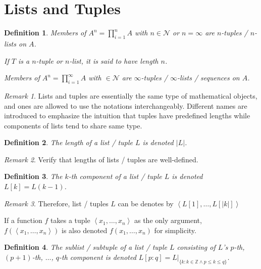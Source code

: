 \documentclass{book}
\newtheorem{definition}{Definition}
\theoremstyle{definition}\newtheorem{mechanism}{Mechanism}
\theoremstyle{remark}\newtheorem*{remark}{Remark}
\begin{document}
\section{Lists and Tuples}

\begin{definition}
	Members of $A^n = \prod_{i=1}^n A$ with $n\in \mathcal N$ or $n=\infty$ are $n$-tuples / $n$-lists on $A$.
	
	If $T$ is a $n$-tuple or $n$-list, it is said to have length $n$.
	
	Members of $A^n = \prod_{i=1}^\infty A$ with $\in \mathcal N$ are $\infty$-tuples / $\infty$-lists / sequences on $A$.
\end{definition}

\begin{remark}
	Lists and tuples are essentially the same type of mathematical objects, and ones are allowed to use the notations interchangeably. Different names are introduced to emphasize the intuition that tuples have predefined lengths while components of lists tend to share same type.
\end{remark}

\begin{definition}
	The length of a list / tuple $L$ is denoted $|L|$.
\end{definition}

\begin{remark}
	Verify that lengths of lists / tuples are well-defined.
\end{remark}

\begin{definition}
	The $k$-th component of a list / tuple $L$ is denoted $L[k] = L(k - 1)$.
\end{definition}

\begin{remark}
	Therefore, list / tuples $L$ can be denotes by $\left<L[1], \dots, L[|k|]\right>$
	
	If a function $f$ takes a tuple $\left<x_1, \dots, x_n\right>$ as the only argument, $f(\left<x_1, \dots, x_n\right>)$ is also denoted $f(x_1, \dots, x_n)$ for simplicity.
\end{remark}

\begin{definition}
	The sublist / subtuple of a list / tuple $L$ consisting of $L$'s $p$-th, $(p + 1)$-th, $\dots$, $q$-th component is denoted $L[p:q] = L|_{\{k: k\in \mathbb Z\land p \le k \le q\}}$.
\end{definition}
\end{document}
